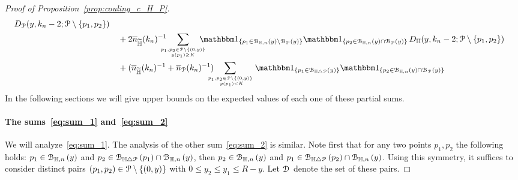 \begin{proof}[Proof of Proposition~\ref{prop:couling_c_H_P}]
\begin{align}
	\, D_\Pcal (y,k_n-2;\Pcal \setminus \{ p_1,p_2\}) \label{eq:sum_4} \\
&\hspace{10pt}+ 2 \expH^{-1} \hspace{-10pt} \sum_{p_1,p_2 \in\Pcal \setminus \{(0,y)\} 
	\atop y(p_1) \geq K} \hspace{-10pt} \ind{p_1\in \BallHyp{y}\setminus \BallPo{y}} \ind{p_2\in \BallHyp{y}\cap \BallPo{y}} 
	\, D_\H (y,k_n-2;\Pcal \setminus \{ p_1,p_2\}) \label{eq:sum_5}\\
&\hspace{10pt}+ (\expH^{-1} + \expP^{-1}) \hspace{-10pt} \sum_{p_1,p_2 \in\Pcal \setminus \{(0,y)\} \atop \ y(p_1) < K}
	\ind{p_1\in \BallSym{y}} \ind{p_2\in \BallHyp{y}\cap \BallPo{y}} \label{eq:sum_6}
\end{align}
In the following sections we will give upper bounds on the expected values of each one of these partial sums. 

\paragraph{The sums~\eqref{eq:sum_1} and~\eqref{eq:sum_2}}

We will analyze~\eqref{eq:sum_1}. The analysis of the other sum~\eqref{eq:sum_2} is similar.
Note first that for any two points $p_1,p_2$ the following holds: $p_1 \in {\mathcal B}_{\mathbb{H},n}\left(y\right)$ and $p_2 \in {\mathcal B}_{\mathbb{H} \bigtriangleup {\mathcal P}}\left(p_1\right)\cap {\mathcal B}_{\mathbb{H},n}\left(y\right)$, then $p_2 \in {\mathcal B}_{\mathbb{H},n}\left(y\right)$ and $p_1 \in {\mathcal B}_{\mathbb{H} \bigtriangleup {\mathcal P}}\left(p_2\right)\cap {\mathcal B}_{\mathbb{H},n}\left(y\right)$.
Using this symmetry, it suffices to consider distinct pairs $(p_1,p_2) \in {\mathcal P} \setminus \{(0,y)\}$ with $0\leq y_2 \leq y_1 \leq R- y$. Let $\mathcal{D}_{}$ denote the set of these pairs. 


\end{proof}
